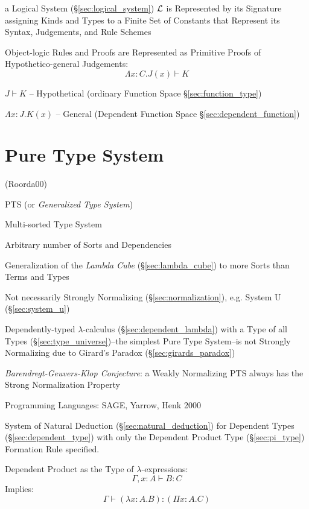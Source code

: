 a Logical System (\S\ref{sec:logical_system}) $\mathcal{L}$ is
Represented by its Signature assigning Kinds and Types to a Finite Set
of Constants that Represent its Syntax, Judgements, and Rule Schemes

Object-logic Rules and Proofs are Represented as Primitive Proofs of
Hypothetico-general Judgements:
\[
  \Lambda x:C.J(x) \vdash K
\]

$J \vdash K$ -- Hypothetical (ordinary Function Space
\S\ref{sec:function_type})

$\Lambda x:J.K(x)$ -- General (Dependent Function Space
\S\ref{sec:dependent_function})



\section{Pure Type System}\label{sec:pts}

(Roorda00) %

PTS (or \emph{Generalized Type System})

Multi-sorted Type System

Arbitrary number of Sorts and Dependencies

Generalization of the \emph{Lambda Cube} (\S\ref{sec:lambda_cube}) to
more Sorts than Terms and Types

Not necessarily Strongly Normalizing (\S\ref{sec:normalization}), e.g.
System U (\S\ref{sec:system_u})

Dependently-typed $\lambda$-calculus (\S\ref{sec:dependent_lambda})
with a Type of all Types (\S\ref{sec:type_universe})--the simplest
Pure Type System--is not Strongly Normalizing due to Girard's Paradox
(\S\ref{sec:girards_paradox})

\emph{Barendregt-Geuvers-Klop Conjecture}: a Weakly Normalizing PTS
always has the Strong Normalization Property

Programming Languages: SAGE, Yarrow, Henk 2000


System of Natural Deduction (\S\ref{sec:natural_deduction}) for
Dependent Types (\S\ref{sec:dependent_type}) with only the Dependent
Product Type (\S\ref{sec:pi_type}) Formation Rule specified.

Dependent Product as the Type of $\lambda$-expressions:
\[
  \Gamma,x:A \vdash B:C
\]
Implies:
\[
  \Gamma \vdash (\lambda x:A.B):(\Pi x:A.C)
\]



